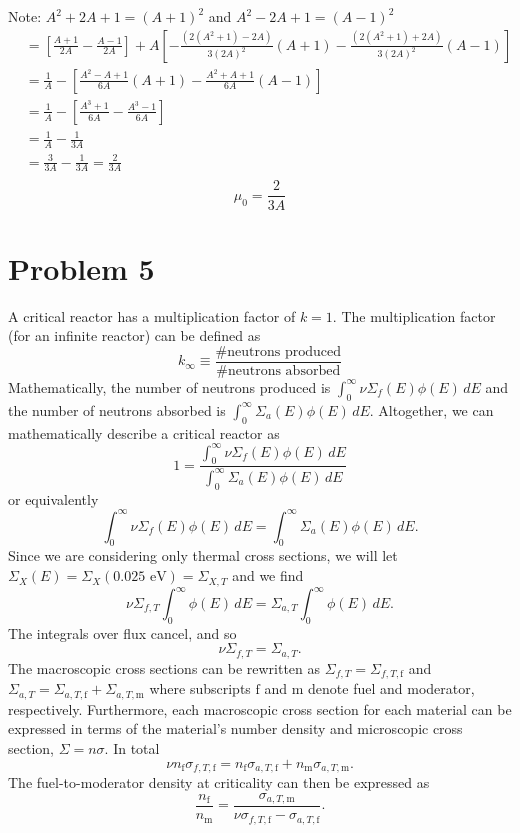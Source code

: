 \documentclass{article}
\begin{document}
Note: $A^2+2A+1 = (A+1)^2$ and $A^2-2A+1 = (A-1)^2$
\begin{align*}
			&= \left[ \frac{A+1}{2A} - \frac{A-1}{2A}\right] + A\left[ -\frac{(2(A^2+1)-2A)}{3(2A)^2}(A+1) - \frac{(2(A^2+1)+2A)}{3(2A)^2}(A-1) \right] \\
			&= \frac{1}{A} - \left[ \frac{A^2-A+1}{6A}(A+1) - \frac{A^2+A+1}{6A}(A-1) \right] \\
			&= \frac{1}{A} - \left[ \frac{A^3+1}{6A} - \frac{A^3-1}{6A} \right] \\
			&= \frac{1}{A} - \frac{1}{3A} \\ 
			&= \frac{3}{3A} - \frac{1}{3A} = \frac{2}{3A}\\ 
\end{align*}
$$\boxed{\mu_0 = \frac{2}{3A} }$$ 




\section*{Problem 5}

A critical reactor has a multiplication factor of $k=1$. The multiplication factor (for an infinite reactor) can be defined as
$$ k_{\infty} \equiv \frac{\text{\# neutrons produced}}{\text{\# neutrons absorbed}} $$
Mathematically, the number of neutrons produced is $\int_0^{\infty} \nu \Sigma_f(E)\phi(E)\,dE$ and the number of neutrons absorbed is $\int_0^{\infty} \Sigma_a(E)\phi(E)\,dE$. Altogether, we can mathematically describe a critical reactor as 
$$ 1 = \frac{\int_0^{\infty} \nu \Sigma_f(E)\phi(E)\,dE}{\int_0^{\infty} \Sigma_a(E)\phi(E)\,dE} $$
or equivalently
$$ \int_0^{\infty} \nu \Sigma_f(E)\phi(E)\,dE = \int_0^{\infty} \Sigma_a(E)\phi(E)\,dE. $$
Since we are considering only thermal cross sections, we will let $\Sigma_X(E) = \Sigma_X(0.025\text{ eV}) = \Sigma_{X,T}$ and we find
$$ \nu \Sigma_{f,T} \int_0^{\infty} \phi(E)\,dE = \Sigma_{a,T} \int_0^{\infty} \phi(E)\,dE. $$
The integrals over flux cancel, and so
$$ \nu \Sigma_{f,T} = \Sigma_{a,T} .$$
The macroscopic cross sections can be rewritten as $\Sigma_{f,T} = \Sigma_{f,T,\text{f}}$ and $\Sigma_{a,T} = \Sigma_{a,T,\text{f}} + \Sigma_{a,T,\text{m}}$ where subscripts $\text{f}$ and $\text{m}$ denote fuel and moderator, respectively. Furthermore, each macroscopic cross section for each material can be expressed in terms of the material's number density and microscopic cross section, $\Sigma = n\sigma$. In total
$$ \nu n_{\text{f}} \sigma_{f,T,\text{f}} = n_{\text{f}} \sigma_{a,T,\text{f}} + n_{\text{m}} \sigma_{a,T,\text{m}} .$$
The fuel-to-moderator density at criticality can then be expressed as
$$ \frac{n_{\text{f}}}{n_{\text{m}}} = \frac{\sigma_{a,T,\text{m}}}{\nu \sigma_{f,T,\text{f}} - \sigma_{a,T,\text{f}}} .$$
\-\\
\end{document}
